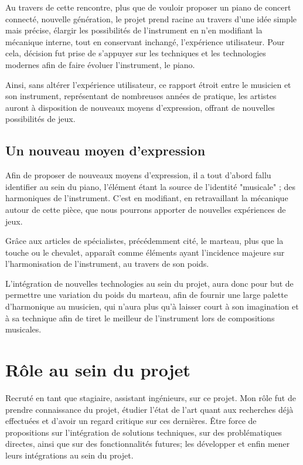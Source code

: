\documentclass[french,a4paper,12pt]{report}
\begin{document}
	Au travers de cette rencontre, plus que de vouloir proposer un piano de concert connecté, nouvelle génération, le projet prend racine au travers d'une idée simple mais précise, élargir les possibilités de l'instrument en n'en modifiant la mécanique interne, tout en conservant inchangé, l'expérience utilisateur.
	Pour cela, décision fut prise de s'appuyer sur les techniques et les technologies modernes afin de faire évoluer l'instrument, le piano.
	
	Ainsi, sans altérer l'expérience utilisateur, ce rapport étroit entre le musicien et son instrument, représentant de nombreuses années de pratique, les artistes auront à disposition de nouveaux moyens d'expression, offrant de nouvelles possibilités de jeux.
	
	\newpage
	
		\subsection{Un nouveau moyen d'expression}
		
		Afin de proposer de nouveaux moyens d'expression, il a tout d'abord fallu identifier au sein du piano, l'élément étant la source de l'identité "musicale" ; des harmoniques de l'instrument. C'est en modifiant, en retravaillant la mécanique autour de cette pièce, que nous pourrons apporter de nouvelles expériences de jeux.
		
		Grâce aux articles de spécialistes, précédemment cité, le marteau, plus que la touche ou le chevalet, apparaît comme éléments ayant l'incidence majeure sur l'harmonisation de l'instrument, au travers de son poids.
		
		L'intégration de nouvelles technologies au sein du projet, aura donc pour but de permettre une variation du poids du marteau, afin de fournir une large palette d'harmonique au musicien, qui n'aura plus qu'à laisser court à son imagination et à sa technique afin de tiret le meilleur de l'instrument lors de compositions musicales.
	
	\section{Rôle au sein du projet}	
	
	Recruté en tant que stagiaire, assistant ingénieurs, sur ce projet. Mon rôle fut de prendre connaissance du projet, étudier l'état de l'art quant aux recherches déjà effectuées et d'avoir un regard critique sur ces dernières. Être force de propositions sur l'intégration de solutions techniques, sur des problématiques directes, ainsi que sur des fonctionnalités futures; les développer et enfin mener leurs intégrations au sein du projet.
	
\end{document}
